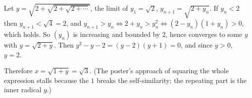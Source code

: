 Let \(y=\sqrt{2+\sqrt{2+\sqrt{2+\cdots}}}\), the limit of \(y_1=\sqrt2\), \(y_{n+1}=\sqrt{2+y_n}\). If \(y_n<2\) then \(y_{n+1}<\sqrt4=2\), and \(y_{n+1}>y_n\iff 2+y_n>y_n^2\iff (2-y_n)(1+y_n)>0\), which holds. So \((y_n)\) is increasing and bounded by \(2\), hence converges to some \(y\) with \(y=\sqrt{2+y}\). Then \(y^2-y-2=(y-2)(y+1)=0\), and since \(y>0\), \(y=2\).

Therefore \(x=\sqrt{1+y}=\boxed{\sqrt3}\). (The poster's approach of squaring the whole expression stalls because the \(1\) breaks the self-similarity; the repeating part is the inner radical \(y\).)
